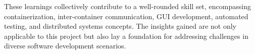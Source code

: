 \documentclass{scrartcl}
\begin{document}
These learnings collectively contribute to a well-rounded skill set, encompassing containerization, inter-container communication, GUI development, automated testing, and distributed systems concepts. The insights gained are not only applicable to this project but also lay a foundation for addressing challenges in diverse software development scenarios.



\nocite{*} %


\end{document}
